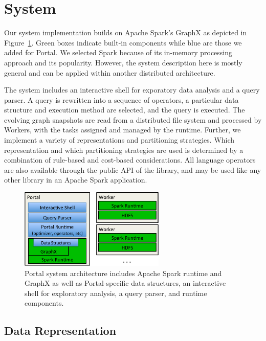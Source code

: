 \section{System}
\label{sec:sys}

Our \ql system implementation builds on Apache Spark's GraphX as
depicted in Figure~\ref{fig:arch}.  Green boxes indicate built-in
components while blue are those we added for Portal.  We selected
Spark because of its in-memory processing approach and its popularity.
However, the system description here is mostly general and can be
applied within another distributed architecture.

The \ql system includes an interactive shell for exporatory data
analysis and a query parser.  A \ql query is rewritten into a sequence
of operators, a particular data structure and execution method are
selected, and the query is executed.  The evolving graph snapshots are
read from a distributed file system and processed by Workers, with the
tasks assigned and managed by the runtime.  
Further, we implement a variety of \tg representations and
partitioning strategies.  Which representation and which partitioning
strategies are used is determined by a combination of rule-based and
cost-based considerations.  All language operators are also available
through the public API of the \ql library, and may be used like any
other library in an Apache Spark application.

\begin{figure}[t!]
\includegraphics[height=1.5in]{figs/architecture.pdf}
\caption{Portal system architecture includes Apache Spark runtime and
  GraphX as well as Portal-specific data structures, an interactive
  shell for exploratory analysis, a query parser, and runtime
  components. }
\label{fig:arch}
\end{figure}

\subsection{Data Representation}

